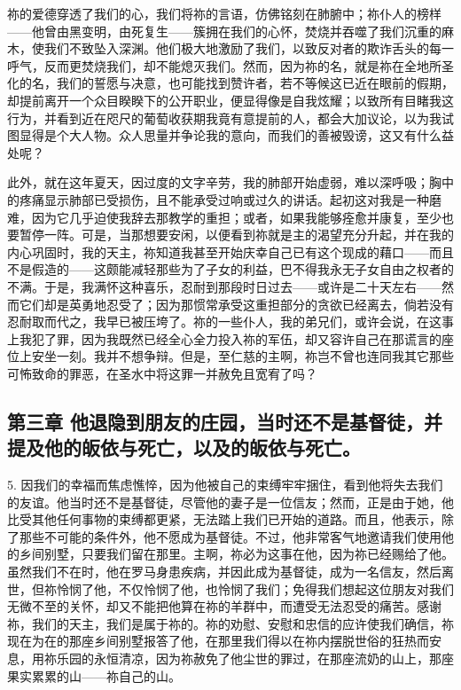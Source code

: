 祢的爱德穿透了我们的心，我们将祢的言语，仿佛铭刻在肺腑中；祢仆人的榜样——他曾由黑变明，由死复生——簇拥在我们的心怀，焚烧并吞噬了我们沉重的麻木，使我们不致坠入深渊。他们极大地激励了我们，以致反对者的欺诈舌头的每一呼气，反而更焚烧我们，却不能熄灭我们。然而，因为祢的名，就是祢在全地所圣化的名，我们的誓愿与决意，也可能找到赞许者，若不等候这已近在眼前的假期，却提前离开一个众目睽睽下的公开职业，便显得像是自我炫耀；以致所有目睹我这行为，并看到近在咫尺的葡萄收获期我竟有意提前的人，都会大加议论，以为我试图显得是个大人物。众人思量并争论我的意向，而我们的善被毁谤，这又有什么益处呢？\par

此外，就在这年夏天，因过度的文字辛劳，我的肺部开始虚弱，难以深呼吸；胸中的疼痛显示肺部已受损伤，且不能承受过响或过久的讲话。起初这对我是一种磨难，因为它几乎迫使我辞去那教学的重担；或者，如果我能够痊愈并康复，至少也要暂停一阵。可是，当那想要安闲，以便看到祢就是主的渴望充分升起，并在我的内心巩固时，我的天主，祢知道我甚至开始庆幸自己已有这个现成的藉口——而且不是假造的——这颇能减轻那些为了子女的利益，巴不得我永无子女自由之权者的不满。于是，我满怀这种喜乐，忍耐到那段时日过去——或许是二十天左右——然而它们却是英勇地忍受了；因为那惯常承受这重担部分的贪欲已经离去，倘若没有忍耐取而代之，我早已被压垮了。祢的一些仆人，我的弟兄们，或许会说，在这事上我犯了罪，因为我既然已经全心全力投入祢的军伍，却又容许自己在那谎言的座位上安坐一刻。我并不想争辩。但是，至仁慈的主啊，祢岂不曾也连同我其它那些可怖致命的罪恶，在圣水中将这罪一并赦免且宽宥了吗？\par


\subsection{第三章 他退隐到朋友的庄园，当时还不是基督徒，并提及他的皈依与死亡，以及的皈依与死亡。}

5. 因我们的幸福而焦虑憔悴，因为他被自己的束缚牢牢捆住，看到他将失去我们的友谊。他当时还不是基督徒，尽管他的妻子是一位信友；然而，正是由于她，他比受其他任何事物的束缚都更紧，无法踏上我们已开始的道路。而且，他表示，除了那些不可能的条件外，他不愿成为基督徒。不过，他非常客气地邀请我们使用他的乡间别墅，只要我们留在那里。主啊，祢必为这事在他，因为祢已经赐给了他。虽然我们不在时，他在罗马身患疾病，并因此成为基督徒，成为一名信友，然后离世，但祢怜悯了他，不仅怜悯了他，也怜悯了我们；免得我们想起这位朋友对我们无微不至的关怀，却又不能把他算在祢的羊群中，而遭受无法忍受的痛苦。感谢祢，我们的天主，我们是属于祢的。祢的劝慰、安慰和忠信的应许使我们确信，祢现在为在的那座乡间别墅报答了他，在那里我们得以在祢内摆脱世俗的狂热而安息，用祢乐园的永恒清凉，因为祢赦免了他尘世的罪过，在那座流奶的山上，那座果实累累的山——祢自己的山。\par

